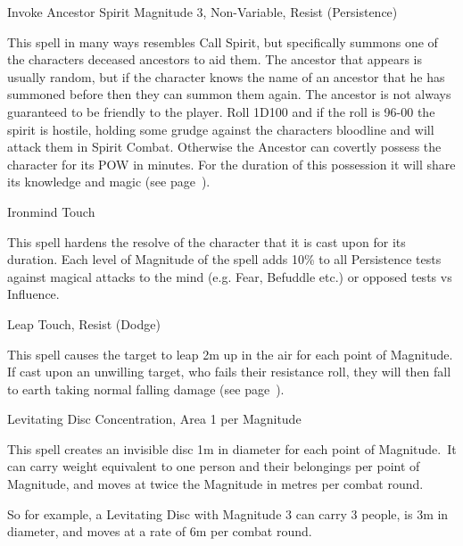\begin{rpg-spell}
{Invoke Ancestor Spirit}
{Magnitude 3, Non-Variable, Resist (Persistence)}

This spell in many ways resembles Call Spirit, but specifically summons one of the characters deceased ancestors to aid them. The ancestor that appears is usually random, but if the character knows the name of an ancestor that he has summoned before then they can summon them again. The ancestor is not always guaranteed to be friendly to the player. Roll 1D100 and if the roll is 96-00 the spirit is hostile, holding some grudge against the characters bloodline and will attack them in Spirit Combat. Otherwise the Ancestor can covertly possess the character for its POW in minutes. For the duration of this possession it will share its knowledge and magic (see page~\pageref{sec:spirits}).
\end{rpg-spell}


\begin{rpg-spell}
{Ironmind}
{Touch}

This spell hardens the resolve of the character that it is cast upon for its duration. Each level of Magnitude of the spell adds 10\% to all Persistence tests against magical attacks to the mind (e.g. Fear, Befuddle etc.) or opposed tests vs Influence.
\end{rpg-spell}


%


%


\begin{rpg-spell}
{Leap}
{Touch, Resist (Dodge)}

This spell causes the target to leap 2m up in the air for each point of Magnitude. If cast upon an unwilling target, who fails their resistance roll, they will then fall to earth taking normal falling damage (see page~\pageref{ssec:falling}).
\end{rpg-spell}


\begin{rpg-spell}
{Levitating Disc}
{Concentration, Area 1 per Magnitude}

This spell creates an invisible disc 1m in diameter for each point of Magnitude. It can carry weight equivalent to one person and their belongings per point of Magnitude, and moves at twice the Magnitude in metres per combat round.

So for example, a Levitating Disc with Magnitude 3 can carry 3 people, is 3m in diameter, and moves at a rate of 6m per combat round.
\end{rpg-spell}


